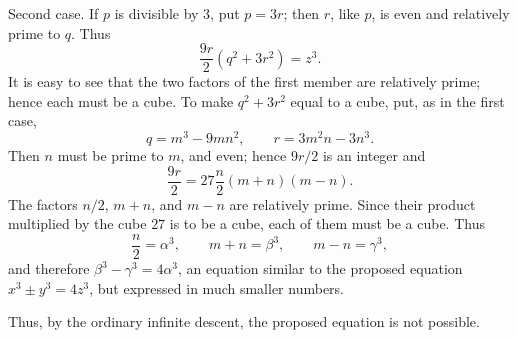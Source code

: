 \documentclass[11pt]{article}
\begin{document}
Second case. If $p$ is divisible by $3$, put $p=3r$; then $r$, like $p$, is even and relatively prime to $q$. Thus
\[
 \frac{9r}{2}(q^2+3r^2)=z^3.
\]
It is easy to see that the two factors of the first member are relatively prime; hence each must be a cube. To make $q^2+3r^2$ equal to a cube, put, as in the first case,
\[
 q=m^3-9mn^2,\qquad r=3m^2n-3n^3.
\]
Then $n$ must be prime to $m$, and even; hence $9r/2$ is an integer and
\[
 \frac{9r}{2}=27\frac n2(m+n)(m-n).
\]
The factors $n/2$, $m+n$, and $m-n$ are relatively prime. Since their product multiplied by the cube $27$ is to be a cube, each of them must be a cube. Thus
\[
 \frac n2=\alpha^3,\qquad m+n=\beta^3,\qquad m-n=\gamma^3,
\]
and therefore $\beta^3-\gamma^3=4\alpha^3$, an equation similar to the proposed equation $x^3\pm y^3=4z^3$, but expressed in much smaller numbers.

Thus, by the ordinary infinite descent, the proposed equation is not possible.
\end{document}
